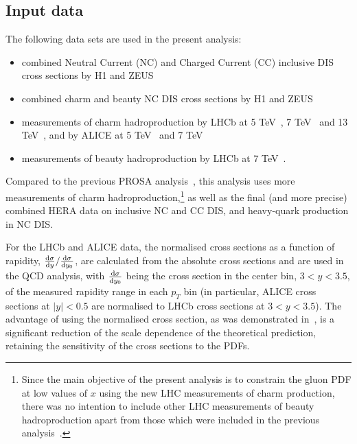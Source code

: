 \documentclass[12pt]{article}
\begin{document}
\subsection{Input data}
\label{sec:data}

The following data sets are used in the present analysis:
\begin{itemize}
    \item combined Neutral Current (NC) and Charged Current (CC) inclusive DIS cross sections by H1 and ZEUS~\cite{Abramowicz:2015mha}
    \item combined charm and beauty NC DIS cross sections by H1 and ZEUS~\cite{H1:2018flt}
    \item measurements of charm hadroproduction by LHCb at 5 TeV~\cite{Aaij:2016jht}, 7 TeV~\cite{Aaij:2013mga} and 13 TeV~\cite{Aaij:2015bpa}, and by ALICE at 5 TeV~\cite{Acharya:2019mgn} and 7 TeV~\cite{Acharya:2017jgo}
    \item measurements of beauty hadroproduction by LHCb at 7 TeV~\cite{Aaij:2013noa}.
\end{itemize}
Compared to the previous PROSA analysis~\cite{Zenaiev:2015rfa}, this analysis uses more measurements of charm hadroproduction,\footnote{Since the main objective of the present analysis is to constrain the gluon PDF at low values of $x$ using the new LHC measurements of charm production, there was no intention to include other LHC measurements of beauty hadroproduction apart from those which were included in the previous analysis~\cite{Zenaiev:2015rfa}.}
as well as the final (and more precise) combined HERA data on inclusive NC and CC DIS, and heavy-quark production in NC DIS.

For the LHCb and ALICE data, the normalised cross sections as a function of rapidity, $\frac{{\rm d}\sigma}{{\rm d}y} / \frac{{\rm d}\sigma}{{\rm d}y_0}$, are calculated from the absolute cross sections and are used in the 
QCD analysis, with $\frac{{\rm d}\sigma}{{\rm d}y_0}$ being the cross section in the center bin, $3 < y < 3.5$, of 
the measured rapidity range in each $p_T$ bin (in particular, ALICE cross sections at $|y| < 0.5$ are normalised to LHCb cross sections at $3 < y < 3.5$). 
The advantage of using the normalised cross section, as was demonstrated in~\cite{Zenaiev:2015rfa}, is a significant
reduction of the scale dependence of the theoretical prediction, retaining the sensitivity of the cross sections to 
the PDFs. 
\end{document}

